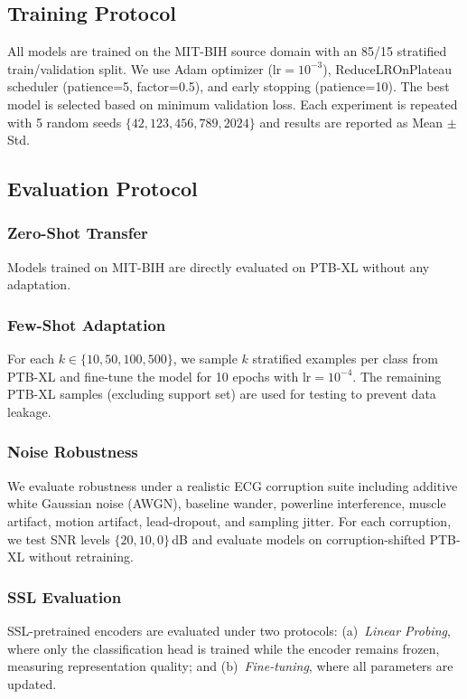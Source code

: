 \documentclass[journal,twoside,web]{ieeecolor}
\begin{document}
\subsection{Training Protocol}
All models are trained on the MIT-BIH source domain with an 85/15 stratified train/validation split. We use Adam optimizer ($\text{lr} = 10^{-3}$), ReduceLROnPlateau scheduler (patience=5, factor=0.5), and early stopping (patience=10). The best model is selected based on minimum validation loss. Each experiment is repeated with 5 random seeds $\{42, 123, 456, 789, 2024\}$ and results are reported as Mean $\pm$ Std.

\subsection{Evaluation Protocol}

\subsubsection{Zero-Shot Transfer}
Models trained on MIT-BIH are directly evaluated on PTB-XL without any adaptation.

\subsubsection{Few-Shot Adaptation}
For each $k \in \{10, 50, 100, 500\}$, we sample $k$ stratified examples per class from PTB-XL and fine-tune the model for 10 epochs with $\text{lr} = 10^{-4}$. The remaining PTB-XL samples (excluding support set) are used for testing to prevent data leakage.

\subsubsection{Noise Robustness}
We evaluate robustness under a realistic ECG corruption suite including additive white Gaussian noise (AWGN), baseline wander, powerline interference, muscle artifact, motion artifact, lead-dropout, and sampling jitter. For each corruption, we test SNR levels $\{20, 10, 0\}$\,dB and evaluate models on corruption-shifted PTB-XL without retraining.

\subsubsection{SSL Evaluation}
SSL-pretrained encoders are evaluated under two protocols: (a)~\textit{Linear Probing}, where only the classification head is trained while the encoder remains frozen, measuring representation quality; and (b)~\textit{Fine-tuning}, where all parameters are updated.
\end{document}

